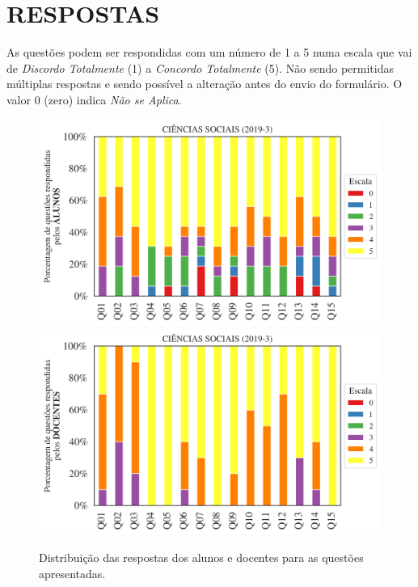 \documentclass[a4paper,10pt]{article}
\begin{document}
\section{RESPOSTAS}
As questões podem ser respondidas com um número de 1 a 5 numa escala que vai de {\it Discordo Totalmente} (1) a {\it Concordo Totalmente} (5). Não sendo permitidas múltiplas respostas e sendo possível a alteração antes do envio do formulário. O valor 0 (zero) indica {\it Não se Aplica}.


\begin{figure}[h]
\centering
\includegraphics[width=0.999\linewidth]{resposta_alunos_questoes_curso_313087.png}
\includegraphics[width=0.999\linewidth]{resposta_docentes_questoes_curso_313087.png}
\caption{\label{fig:resposta_questoes_curso}Distribuição das respostas dos alunos e docentes para as questões apresentadas. }
\end{figure}
\end{document}
